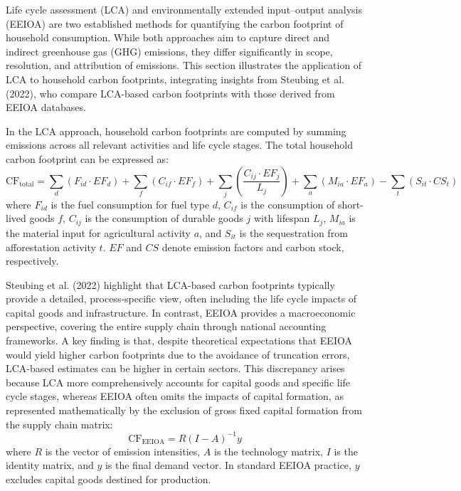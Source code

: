 \documentclass[12pt,a4paper]{article}%
\begin{document}
Life cycle assessment (LCA) and environmentally extended input--output analysis (EEIOA) are two established methods for quantifying the carbon footprint of household consumption. While both approaches aim to capture direct and indirect greenhouse gas (GHG) emissions, they differ significantly in scope, resolution, and attribution of emissions. This section illustrates the application of LCA to household carbon footprints, integrating insights from Steubing et al. (2022), who compare LCA-based carbon footprints with those derived from EEIOA databases.

In the LCA approach, household carbon footprints are computed by summing emissions across all relevant activities and life cycle stages. The total household carbon footprint can be expressed as:
\begin{equation}
\text{CF}_{\text{total}} = \sum_d (F_{id} \cdot EF_d) 
+ \sum_f (C_{if} \cdot EF_f) 
+ \sum_j \left( \frac{C_{ij} \cdot EF_j}{L_j} \right)
+ \sum_a (M_{ia} \cdot EF_a)
- \sum_t (S_{it} \cdot CS_t)
\end{equation}
where $F_{id}$ is the fuel consumption for fuel type $d$, $C_{if}$ is the consumption of short-lived goods $f$, $C_{ij}$ is the consumption of durable goods $j$ with lifespan $L_j$, $M_{ia}$ is the material input for agricultural activity $a$, and $S_{it}$ is the sequestration from afforestation activity $t$. $EF$ and $CS$ denote emission factors and carbon stock, respectively.

Steubing et al. (2022) highlight that LCA-based carbon footprints typically provide a detailed, process-specific view, often including the life cycle impacts of capital goods and infrastructure. In contrast, EEIOA provides a macroeconomic perspective, covering the entire supply chain through national accounting frameworks. A key finding is that, despite theoretical expectations that EEIOA would yield higher carbon footprints due to the avoidance of truncation errors, LCA-based estimates can be higher in certain sectors. This discrepancy arises because LCA more comprehensively accounts for capital goods and specific life cycle stages, whereas EEIOA often omits the impacts of capital formation, as represented mathematically by the exclusion of gross fixed capital formation from the supply chain matrix:
\begin{equation}
\text{CF}_{\text{EEIOA}} = R (I - A)^{-1} y
\end{equation}
where $R$ is the vector of emission intensities, $A$ is the technology matrix, $I$ is the identity matrix, and $y$ is the final demand vector. In standard EEIOA practice, $y$ excludes capital goods destined for production.
\end{document}

